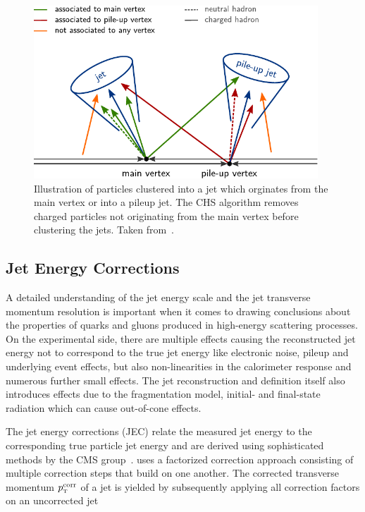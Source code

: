 \begin{figure}[h!tbp]
    \centering
    \includegraphics[width=0.95\textwidth]{figures/experimental_setup/chs.pdf}
    \caption[Charged Hadron Subtraction]{Illustration of particles clustered
    into a jet which orginates from the main vertex or into a pileup jet. The
    CHS algorithm removes charged particles not originating from the main vertex
    before clustering the jets. Taken from~\cite{Berger:2014aca}.}
    \label{fig:chs_jets}
\end{figure}


\subsection{Jet Energy Corrections}
\label{sec:jec}

A detailed understanding of the jet energy scale and the jet transverse momentum
resolution is important when it comes to drawing conclusions about the
properties of quarks and gluons produced in high-energy scattering processes. On the
experimental side, there are multiple effects causing the reconstructed jet
energy not to correspond to the true jet energy like electronic noise, pileup
and underlying event effects, but also non-linearities in the calorimeter
response and numerous further small effects. The jet reconstruction and
definition itself also introduces effects due to the fragmentation model,
initial- and final-state radiation which can cause out-of-cone effects.

The jet energy corrections (JEC) relate the measured jet energy to the
corresponding true particle jet energy and are derived using sophisticated
methods by the CMS \JetMET group~\cite{jec_paper}. \CMS uses a factorized
correction approach consisting of multiple correction steps that build on one
another. The corrected transverse momentum $\pt^{\mathrm{corr}}$ of a jet is
yielded by subsequently applying all correction factors on an uncorrected jet

